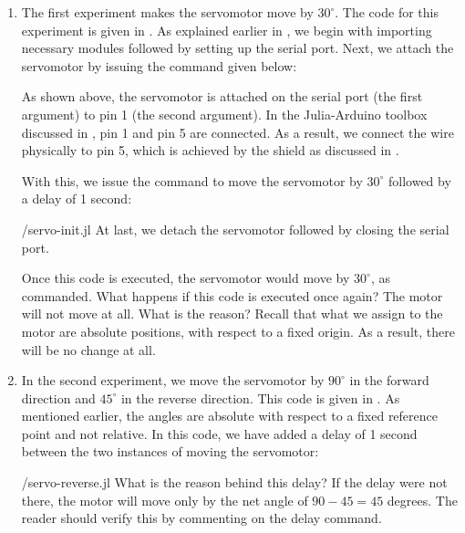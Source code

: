 \begin{enumerate}
  \item The first experiment makes the servomotor move by $30^\circ$. The code for this experiment is
        given in . As explained earlier in , 
        we begin with importing necessary modules followed by setting up the serial port.
        Next, we attach the servomotor by issuing the command given below:
        
        As shown above, the servomotor is attached on the serial port (the first argument)
        to pin 1 (the second argument).  In the Julia-Arduino toolbox discussed 
        in , pin 1 and pin 5 are connected. As a result, we connect the wire physically to
        pin 5, which is achieved by the shield as discussed in .
        
        With this, we issue the command to move the servomotor by $30^\circ$ followed by a delay of 
        1 second:
        
        {\LocSERjuliacode/servo-init.jl}
        At last, we  detach the servomotor followed by closing the serial port. 
        
        Once this code is executed, the servomotor would move by
        $30^\circ$, as commanded.  What happens if this code is executed
        once again?  The motor will not move at all.  What is the reason?
        Recall that what we assign to the motor are absolute positions, with
        respect to a fixed origin.  As a result, there will be no change at
        all. 
        
  \item In the second experiment, we move the servomotor by $90^\circ$ in the
        forward direction and $45^\circ$ in the reverse direction.  This
        code is given in .  As mentioned
        earlier, the angles are absolute with respect to a fixed reference
        point and not relative.   In this code, 
        we have added a delay of 1 second between the two instances of 
        moving the servomotor: 
        
        {\LocSERjuliacode/servo-reverse.jl}
        What is the reason behind this delay?  If the delay were not
        there, the motor will move only by the net angle of $90-45 = 45$
        degrees.  The reader should verify this by commenting on the delay
        command. 
        

\end{enumerate}
